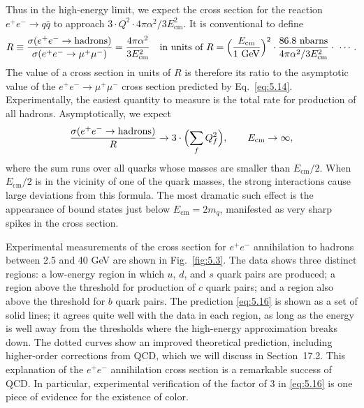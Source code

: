 Thus in the high-energy limit, we expect the cross section for the reaction
$e^{+}e^{-}\to q\bar{q}$ to approach $3\cdot Q^2\cdot 4\pi\alpha^2/3E^2_{\mathrm{cm}}$.
It is conventional to define
\begin{equation}
  R \equiv \frac{\sigma(e^{+}e^{-}\to\text{hadrons})}
    {\sigma(e^{+}e^{-}\to\mu^{+}\mu^{-})}
  = \frac{4\pi\alpha^2}{3E_{\mathrm{cm}}^2}
    \quad\text{in units of } R
    = \Bigl( \frac{E_{\mathrm{cm}}}{1\ \mathrm{GeV}} \Bigr)^2 \cdot
      \frac{86.8\ \mathrm{nbarns}}{4\pi\alpha^2/3E_{\mathrm{cm}}^2}
      \cdot\ \cdots .
  \label{eq:5.15}
\end{equation}
The value of a cross section in units of $R$ is therefore its ratio to the
asymptotic value of the $e^{+}e^{-}\to\mu^{+}\mu^{-}$ cross section predicted
by Eq.~\eqref{eq:5.14}.  Experimentally, the easiest quantity to measure is
the total rate for production of all hadrons.  Asymptotically, we expect
\begin{equation}
  \frac{\sigma(e^{+}e^{-}\to\text{hadrons})}{R}
    \to 3\cdot\Bigl( \sum_f Q_f^2 \Bigr),
  \qquad E_{\mathrm{cm}} \to \infty ,
  \label{eq:5.16}
\end{equation}
where the sum runs over all quarks whose masses are smaller than
$E_{\mathrm{cm}}/2$.  When $E_{\mathrm{cm}}/2$ is in the vicinity of one of
the quark masses, the strong interactions cause large deviations from this
formula.  The most dramatic such effect is the appearance of bound states just
below $E_{\mathrm{cm}} = 2m_q$, manifested as very sharp spikes in the cross
section.

Experimental measurements of the cross section for $e^{+}e^{-}$ annihilation
to hadrons between 2.5 and 40 GeV are shown in Fig.~\ref{fig:5.3}.  The data
shows three distinct regions: a low-energy region in which $u$, $d$, and $s$
quark pairs are produced; a region above the threshold for production of $c$
quark pairs; and a region also above the threshold for $b$ quark pairs.  The
prediction \eqref{eq:5.16} is shown as a set of solid lines; it agrees quite
well with the data in each region, as long as the energy is well away from the
thresholds where the high-energy approximation breaks down.  The dotted
curves show an improved theoretical prediction, including higher-order
corrections from QCD, which we will discuss in Section~17.2.  This explanation
of the $e^{+}e^{-}$ annihilation cross section is a remarkable success of QCD.
In particular, experimental verification of the factor of 3 in
\eqref{eq:5.16} is one piece of evidence for the existence of color.

